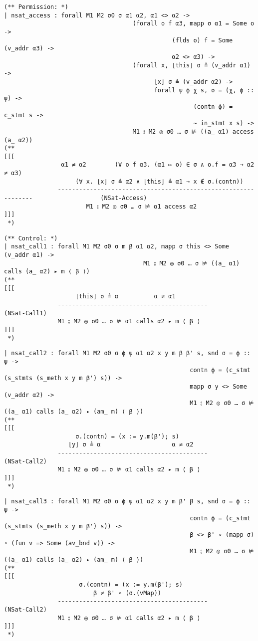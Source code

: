 \documentclass[12pt]{article}
\begin{document}
\begin{verbatim}
(** Permission: *)
| nsat_access : forall M1 M2 σ0 σ α1 α2, α1 <> α2 ->
                                    (forall o f α3, mapp σ α1 = Some o ->
                                               (flds o) f = Some (v_addr α3) ->
                                               α2 <> α3) ->
                                    (forall x, ⌊this⌋ σ ≜ (v_addr α1) ->
                                          ⌊x⌋ σ ≜ (v_addr α2) ->
                                          forall ψ ϕ χ s, σ = (χ, ϕ :: ψ) ->
                                                     (contn ϕ) = c_stmt s ->
                                                     ~ in_stmt x s) ->
                                    M1 ⦂ M2 ◎ σ0 … σ ⊭ ((a_ α1) access (a_ α2))
(**
[[[
                α1 ≠ α2        (∀ o f α3. (α1 ↦ o) ∈ σ ∧ o.f = α3 → α2 ≠ α3)
                    (∀ x. ⌊x⌋ σ ≜ α2 ∧ ⌊this⌋ ≜ α1 → x ∉ σ.(contn))
               ---------------------------------------------------------------                   (NSat-Access)
                       M1 ⦂ M2 ◎ σ0 … σ ⊭ α1 access α2
]]]
 *)
\end{verbatim}
\begin{verbatim}
(** Control: *)
| nsat_call1 : forall M1 M2 σ0 σ m β α1 α2, mapp σ this <> Some (v_addr α1) ->
                                       M1 ⦂ M2 ◎ σ0 … σ ⊭ ((a_ α1) calls (a_ α2) ▸ m ⟨ β ⟩)
(**
[[[
                    ⌊this⌋ σ ≜ α          α ≠ α1
               ------------------------------------------                   (NSat-Call1)
               M1 ⦂ M2 ◎ σ0 … σ ⊭ α1 calls α2 ▸ m ⟨ β ⟩
]]]
 *)
\end{verbatim}
\begin{verbatim}
| nsat_call2 : forall M1 M2 σ0 σ ϕ ψ α1 α2 x y m β β' s, snd σ = ϕ :: ψ ->
                                                    contn ϕ = (c_stmt (s_stmts (s_meth x y m β') s)) ->
                                                    mapp σ y <> Some (v_addr α2) ->
                                                    M1 ⦂ M2 ◎ σ0 … σ ⊭ ((a_ α1) calls (a_ α2) ▸ (am_ m) ⟨ β ⟩)
(**
[[[
                    σ.(contn) = (x := y.m(β'); s) 
                  ⌊y⌋ σ ≜ α                    α ≠ α2
               ------------------------------------------                   (NSat-Call2)
               M1 ⦂ M2 ◎ σ0 … σ ⊭ α1 calls α2 ▸ m ⟨ β ⟩
]]]
 *)
\end{verbatim}
\begin{verbatim}
| nsat_call3 : forall M1 M2 σ0 σ ϕ ψ α1 α2 x y m β' β s, snd σ = ϕ :: ψ ->
                                                    contn ϕ = (c_stmt (s_stmts (s_meth x y m β') s)) ->
                                                    β <> β' ∘ (mapp σ) ∘ (fun v => Some (av_bnd v)) ->
                                                    M1 ⦂ M2 ◎ σ0 … σ ⊭ ((a_ α1) calls (a_ α2) ▸ (am_ m) ⟨ β ⟩)
(**
[[[
                     σ.(contn) = (x := y.m(β'); s)
                         β ≠ β' ∘ (σ.(vMap))
               ------------------------------------------                   (NSat-Call2)
               M1 ⦂ M2 ◎ σ0 … σ ⊭ α1 calls α2 ▸ m ⟨ β ⟩
]]]
 *)
\end{verbatim}
\end{document}

